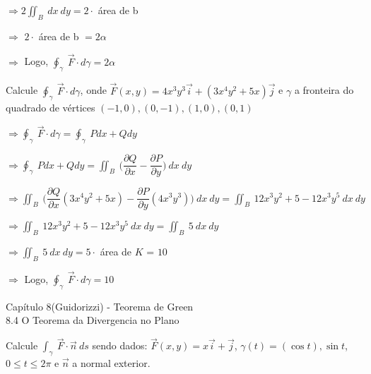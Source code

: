 \documentclass[11pt,a4paper]{article}
\begin{document}
\begin{enumerate}
{{		$\Rightarrow 2\displaystyle\iint_B\ dx\ dy = 2 \cdot$ área de b 
		
		$\Rightarrow$ $2 \cdot$ área de b $ = 2\alpha$
		
		$\Rightarrow$ Logo, $\oint_\gamma\ \vec{F} \cdot d\gamma = 2\alpha$
		
		
		\item Calcule $\oint_\gamma\ \vec{F} \cdot d\gamma$, onde $\vec{F}(x,y) = 4x^3y^3\vec{i} + (3x^4y^2 + 5x)\vec{j}$ e $\gamma$ a fronteira do quadrado de vértices $(-1,0),(0,-1),(1,0), (0,1)$
		
		$\Rightarrow \displaystyle\oint_\gamma\ \vec{F} \cdot d\gamma = \displaystyle\oint_\gamma\ Pdx + Qdy$
		
		$\Rightarrow \displaystyle\oint_\gamma\ Pdx + Qdy = \displaystyle\iint_B\ \Bigg(\dfrac{\partial Q}{\partial x} - \dfrac{\partial P}{\partial y}\Bigg)\ dx\ dy$
		
		$\Rightarrow \displaystyle\iint_B\ \Bigg(\dfrac{\partial Q}{\partial x}(3x^4y^2 + 5x) - \dfrac{\partial P}{\partial y}(4x^3y^3)\Bigg)\ dx\ dy = \displaystyle\iint_B\ 12x^3y^2 + 5 - 12x^3y^5\ dx\ dy$
		
		$\Rightarrow \displaystyle\iint_B\ 12x^3y^2 + 5 - 12x^3y^5\ dx\ dy = \displaystyle\iint_B\ 5\ dx\ dy$
		
		$\Rightarrow \displaystyle\iint_B\ 5\ dx\ dy = 5 \cdot$ área de $K$ = $10$
		
		$\Rightarrow$ Logo, $\oint_\gamma\ \vec{F} \cdot d\gamma = 10$
		
	\begin{center}
	    \begin{large}Capítulo 8(Guidorizzi) - Teorema de Green\\8.4 O Teorema da Divergencia no Plano
	    \end{large}
	\end{center}
		
		\item Calcule $\displaystyle\int_\gamma\ \vec{F} \cdot \vec{n}\ ds$ sendo dados: $\vec{F}(x,y) = x\vec{i} + \vec{j}$, $\gamma(t) = (\cos t), \sin t$, $0 \leq t \leq 2\pi$ e $\vec{n}$ a normal exterior.
		
}}
\end{enumerate}
\end{document}
